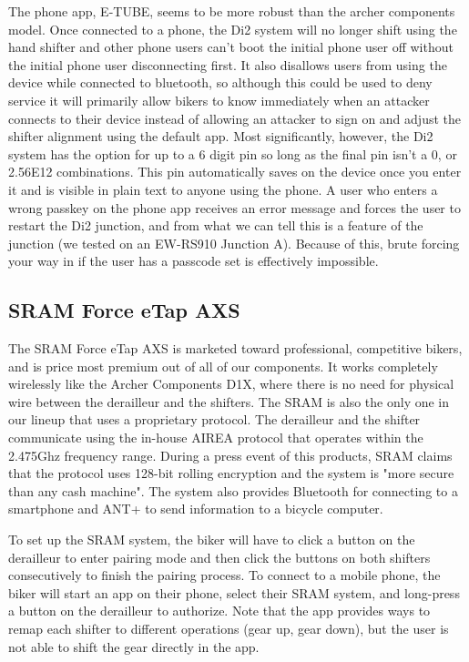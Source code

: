 \documentclass[letterpaper,twocolumn,10pt]{article}
\begin{document}
The phone app, E-TUBE, seems to be more robust than the archer components model. Once connected to a phone, the Di2 system will no longer shift using the hand shifter and other phone users can't boot the initial phone user off without the initial phone user disconnecting first. It also disallows users from using the device while connected to bluetooth, so although this could be used to deny service it will primarily allow bikers to know immediately when an attacker connects to their device instead of allowing an attacker to sign on and adjust the shifter alignment using the default app. Most significantly, however, the Di2 system has the option for up to a 6 digit pin so long as the final pin isn't a 0, or 2.56E12 combinations. This pin automatically saves on the device once you enter it and is visible in plain text to anyone using the phone. A user who enters a wrong passkey on the phone app receives an error message and forces the user to restart the Di2 junction, and from what we can tell this is a feature of the junction (we tested on an EW-RS910 Junction A). Because of this, brute forcing your way in if the user has a passcode set is effectively impossible.

\subsection{SRAM Force eTap AXS}
The SRAM Force eTap AXS \cite{etap} is marketed toward professional, competitive bikers, and is price most premium out of all of our components. It works completely wirelessly like the Archer Components D1X, where there is no need for physical wire between the derailleur and the shifters. The SRAM is also the only one in our lineup that uses a proprietary protocol. The derailleur and the shifter communicate using the in-house AIREA protocol that operates within the 2.475Ghz frequency range. During a press event of this products, SRAM claims that  the protocol uses 128-bit rolling encryption and the system is "more secure than any cash machine".\cite{phillips2015SRAM} The system also provides Bluetooth for connecting to a smartphone and ANT+ to send information to a bicycle computer.

To set up the SRAM system, the biker will have to click a button on the derailleur to enter pairing mode and then click the buttons on both shifters consecutively to finish the pairing process. To connect to a mobile phone, the biker will start an app on their phone, select their SRAM system, and long-press a button on the derailleur to authorize. Note that the app provides ways to remap each shifter to different operations (gear up, gear down), but the user is not able to shift the gear directly in the app.
\end{document}
